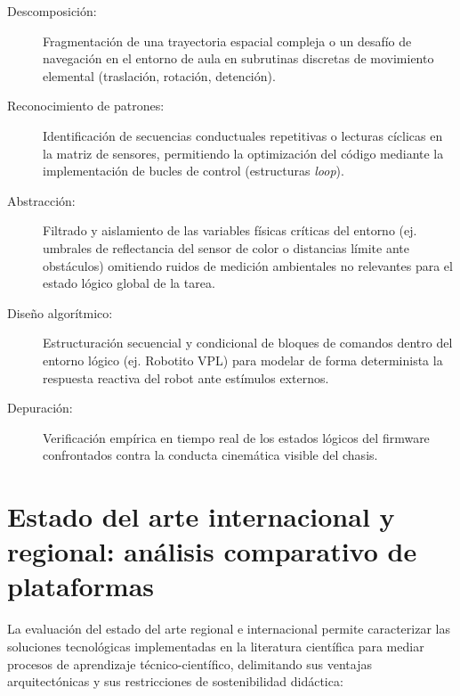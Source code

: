 \documentclass{prgrado}
\begin{document}
\begin{description}
    \item[Descomposición:] Fragmentación de una trayectoria espacial compleja o un desafío de navegación en el entorno de aula en subrutinas discretas de movimiento elemental (traslación, rotación, detención).
    \item[Reconocimiento de patrones:] Identificación de secuencias conductuales repetitivas o lecturas cíclicas en la matriz de sensores, permitiendo la optimización del código mediante la implementación de bucles de control (estructuras \textit{loop}).
    \item[Abstracción:] Filtrado y aislamiento de las variables físicas críticas del entorno (ej. umbrales de reflectancia del sensor de color o distancias límite ante obstáculos) omitiendo ruidos de medición ambientales no relevantes para el estado lógico global de la tarea.
    \item[Diseño algorítmico:] Estructuración secuencial y condicional de bloques de comandos dentro del entorno lógico (ej. Robotito VPL) para modelar de forma determinista la respuesta reactiva del robot ante estímulos externos.
    \item[Depuración:] Verificación empírica en tiempo real de los estados lógicos del firmware confrontados contra la conducta cinemática visible del chasis.
\end{description}

\section{Estado del arte internacional y regional: análisis comparativo de plataformas}

La evaluación del estado del arte regional e internacional permite caracterizar las soluciones tecnológicas implementadas en la literatura científica para mediar procesos de aprendizaje técnico-científico, delimitando sus ventajas arquitectónicas y sus restricciones de sostenibilidad didáctica:
\end{document}
